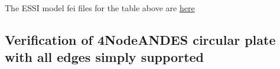 \documentclass[fleqn,11pt]{article}
\begin{document}
The ESSI model fei files for the table above are \href{https://github.com/yuan-energy/ESSI_Verification/blob/master/4NodeANDES/circular_plate_clamped/circular_plate_clamped.tar.gz?raw=true}{here}





































\newpage
\subsection{Verification of 4NodeANDES circular plate with all edges simply supported}
\end{document}
